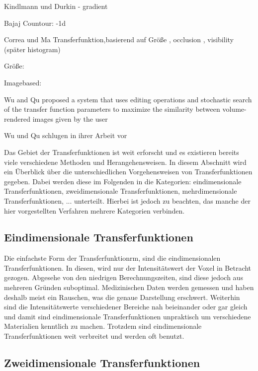 Kindlmann und Durkin  \cite{kindlmann1998semi} - gradient


Bajaj Countour: \cite{bajaj1997contour} -1d


Correa und Ma Transferfunktion,basierend auf Größe \cite{correa2008size}, occlusion \cite{correa2009occlusion}, visibility \cite{correa2009visibility}(später histogram\cite{correa2011visibility})


Größe: 




Imagebased:

 
Wu and Qu
proposed a system that uses editing operations and stochastic
search of the transfer function parameters to maximize the
similarity between volume-rendered images given by the user

Wu und Qu schlugen in ihrer Arbeit vor \cite{wu2007interactive}


Das Gebiet der Transferfunktionen ist weit erforscht und es existieren bereits viele verschiedene Methoden und Herangehensweisen. In diesem Abschnitt wird ein Überblick über die unterschiedlichen Vorgehensweisen von Transferfunktionen gegeben. Dabei werden diese im Folgenden in die Kategorien: eindimensionale Transferfunktionen, zweidimensionale Transferfunktionen, mehrdimensionale Transferfunktionen, ... unterteilt. Hierbei ist jedoch zu beachten, das manche der hier vorgestellten Verfahren mehrere Kategorien verbinden.


\subsection{Eindimensionale Transferfunktionen}

Die einfachste Form der Transferfunktionrm, sind die eindimensionalen Transferfunktionen. In diesen, wird nur der Intensitätswert der Voxel in Betracht gezogen. Abgesehe von den niedrigen Berechnungszeiten, sind diese jedoch aus mehreren Gründen suboptimal. Medizinischen Daten werden gemessen und haben deshalb meist ein Rauschen, was die genaue Darstellung erschwert. Weiterhin sind die Intensitätswerte verschiedener Bereiche nah beieinander oder gar gleich und damit sind eindimensionale Transferfunktionen unpraktisch um verschiedene Materialien kenntlich zu machen. Trotzdem sind eindimensionale Transferfunktionen weit verbreitet und werden oft benutzt. 

\subsection{Zweidimensionale Transferfunktionen}

